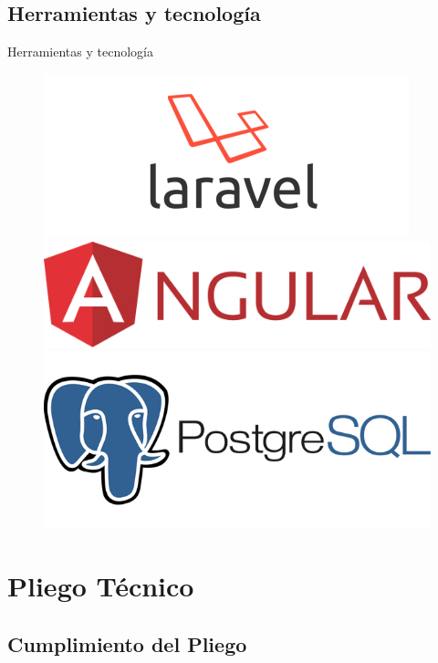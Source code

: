 \documentclass{beamer}
\begin{document}
\subsection{Herramientas y tecnolog\'ia}
\begin{frame}{Herramientas y tecnolog\'ia}
		\begin{figure}[H]
	\centering
	\includegraphics[width=0.35\paperwidth, height=0.3\paperheight]{images_latex/laravel}
	\hspace{0.1cm}
	\includegraphics[width=0.35\paperwidth, height=0.2\paperheight]{images_latex/angular}
	\centering
	\includegraphics[width=0.4\paperwidth, height=0.35\paperheight]{images_latex/postgresql-nombre}
	\end{figure}
	
	\end{frame}

\section{Pliego T\'ecnico}

\subsection{Cumplimiento del Pliego}
\end{document}
